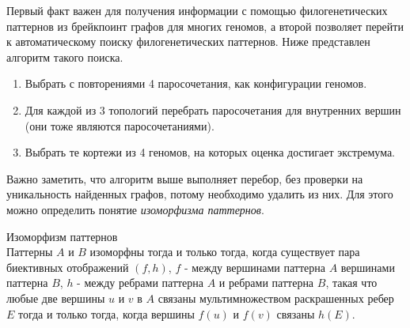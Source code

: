 Первый факт важен для получения информации с помощью филогенетических паттернов из брейкпоинт графов для многих геномов,
а второй позволяет перейти к автоматическому поиску филогенетических паттернов.
Ниже представлен алгоритм такого поиска.
\begin{enumerate}
  \item Выбрать с повторениями 4 паросочетания, как конфигурации геномов.
  \item Для каждой из 3 топологий перебрать паросочетания для внутренних вершин (они тоже являются паросочетаниями).
  \item Выбрать те кортежи из 4 геномов, на которых оценка достигает экстремума.
\end{enumerate}

Важно заметить, что алгоритм выше выполняет перебор, без проверки на уникальность найденных графов, потому необходимо удалить  из них.
Для этого можно определить понятие \textit{изоморфизма паттернов}.
\begin{define}{Изоморфизм паттернов} \\
  Паттерны $A$ и $B$ изоморфны тогда и только тогда, когда существует пара биективных отображений $(f, h)$,
  $f$ - между вершинами паттерна $A$ вершинами паттерна $B$, $h$ - между ребрами паттерна $A$ и ребрами паттерна $B$,
  такая что любые две вершины $u$ и $v$ в $A$ связаны мультимножеством раскрашенных ребер $E$ тогда и только тогда, когда вершины
  $f(u)$ и $f(v)$ связаны $h(E)$.
\end{define}
\vspace{-2em}
